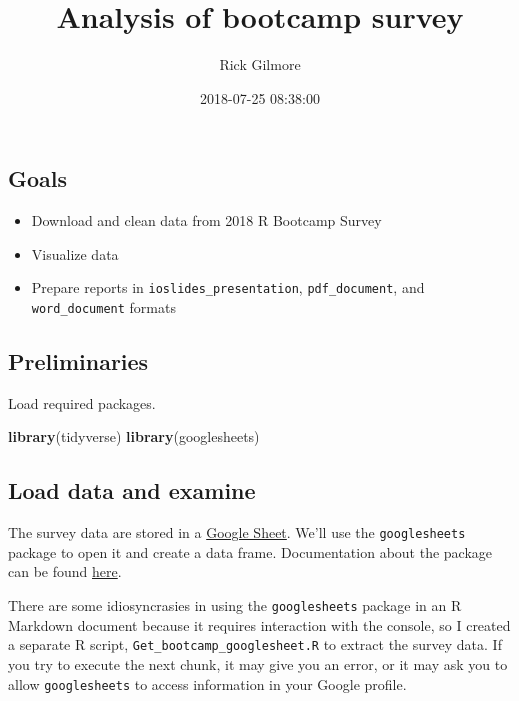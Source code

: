 \documentclass[]{article}
\title{Analysis of bootcamp survey}
\author{Rick Gilmore}
\date{2018-07-25 08:38:00}
\newenvironment{Shaded}{\begin{snugshade}}{\end{snugshade}}
\newcommand{\KeywordTok}[1]{\textcolor[rgb]{0.13,0.29,0.53}{\textbf{#1}}}
\newcommand{\NormalTok}[1]{#1}
\providecommand{\tightlist}{%
  \setlength{\itemsep}{0pt}\setlength{\parskip}{0pt}}
\begin{document}
\maketitle

{
\setcounter{tocdepth}{3}
\tableofcontents
}
\subsection{Goals}\label{goals}

\begin{itemize}
\tightlist
\item
  Download and clean data from 2018 R Bootcamp Survey
\item
  Visualize data
\item
  Prepare reports in \texttt{ioslides\_presentation},
  \texttt{pdf\_document}, and \texttt{word\_document} formats
\end{itemize}

\subsection{Preliminaries}\label{preliminaries}

Load required packages.

\begin{Shaded}
\begin{Highlighting}[]
\KeywordTok{library}\NormalTok{(tidyverse)}
\KeywordTok{library}\NormalTok{(googlesheets)}
\end{Highlighting}
\end{Shaded}

\subsection{Load data and examine}\label{load-data-and-examine}

The survey data are stored in a
\href{https://docs.google.com/spreadsheets/d/1-YB0iWUNN_9oxBhz221NFiyBOcwMfHziFeUiUvQwn7k/edit\#gid=2108979913}{Google
Sheet}. We'll use the \texttt{googlesheets} package to open it and
create a data frame. Documentation about the package can be found
\href{https://cran.r-project.org/web/packages/googlesheets/vignettes/basic-usage.html}{here}.

There are some idiosyncrasies in using the \texttt{googlesheets} package
in an R Markdown document because it requires interaction with the
console, so I created a separate R script,
\texttt{Get\_bootcamp\_googlesheet.R} to extract the survey data. If you
try to execute the next chunk, it may give you an error, or it may ask
you to allow \texttt{googlesheets} to access information in your Google
profile.
\end{document}
